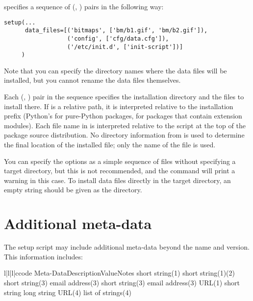 \documentclass{manual}
\begin{document}
 specifies a sequence of (,
) pairs in the following way:

\begin{verbatim}
setup(...
      data_files=[('bitmaps', ['bm/b1.gif', 'bm/b2.gif']),
                  ('config', ['cfg/data.cfg']),
                  ('/etc/init.d', ['init-script'])]
     )
\end{verbatim}

Note that you can specify the directory names where the data files
will be installed, but you cannot rename the data files themselves.

Each (, ) pair in the sequence specifies the
installation directory and the files to install there.  If
 is a relative path, it is interpreted relative to the
installation prefix (Python's  for pure-Python
packages,  for packages that contain extension
modules).  Each file name in  is interpreted relative to
the  script at the top of the package source
distribution.  No directory information from  is used to
determine the final location of the installed file; only the name of
the file is used.

You can specify the  options as a simple sequence
of files without specifying a target directory, but this is not recommended,
and the  command will print a warning in this case.
To install data files directly in the target directory, an empty
string should be given as the directory.

\section{Additional meta-data}
\label{meta-data}

The setup script may include additional meta-data beyond the name and
version. This information includes:

\begin{tableiv}{l|l|l|c}{code}%
  {Meta-Data}{Description}{Value}{Notes}
         {short string}{(1)}
         {short string}{(1)(2)}
         {short string}{(3)}
         {email address}{(3)}
         {short string}{(3)}
         {email address}{(3)}
         {URL}{(1)}
         {short string}{}
         {long string}{}
         {URL}{(4)}
         {list of strings}{(4)}
\end{tableiv}
\end{document}
